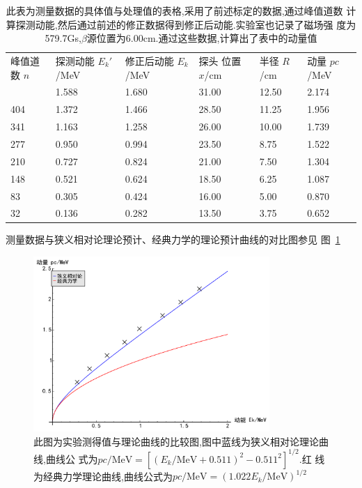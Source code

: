 \documentclass[aps,pre,12pt,preprint,onecolumn,showpacs,showkeys]{revtex4-1}
\begin{document}
\begin{table}[htbp]
  \caption{\label{tab:table1}%
此表为测量数据的具体值与处理值的表格,采用了前述标定的数据,通过峰值道数
计算探测动能,然后通过前述的修正数据得到修正后动能.实验室也记录了磁场强
度为579.7Gs,$\beta$源位置为6.00cm.通过这些数据,计算出了表中的动量值}
\begin{ruledtabular}
  \begin{tabular}{llllll}
     峰值道数 $n$ & 探测动能 $E_k'$/MeV & 修正后动能  $E_k$/MeV & 探头
     位置 $x$/cm & 半径 $R$/cm & 动量 $pc$/MeV\\
     \colrule
     469.0 & 1.588 & 1.680 & 31.00 & 12.50 & 2.174 \\
404 & 1.372 & 1.466 & 28.50 & 11.25 & 1.956 \\
341 & 1.163 & 1.258 & 26.00 & 10.00 & 1.739 \\
277 & 0.950 & 0.994 & 23.50 & 8.75 & 1.522 \\
210 & 0.727 & 0.824 & 21.00 & 7.50 & 1.304 \\
148 & 0.521 & 0.624 & 18.50 & 6.25 & 1.087 \\
83 & 0.305 & 0.424 & 16.00 & 5.00 & 0.870 \\
32 & 0.136 & 0.282 & 13.50 & 3.75 & 0.652 
\end{tabular}
\end{ruledtabular}
\end{table}


测量数据与狭义相对论理论预计、经典力学的理论预计曲线的对比图参见
图~\ref{fig:plot2}

\begin{figure}[htbp]
  \centering
\includegraphics[width=0.8\textwidth]{plot2.pdf}
\caption{\label{fig:plot2}%
此图为实验测得值与理论曲线的比较图,图中蓝线为狭义相对论理论曲线,曲线公
式为$pc/\text{MeV} = [(E_k/\text{MeV} + 0.511)^2 - 0.511^2]^{1/2}$.红
线为经典力学理论曲线,曲线公式为$pc/\text{MeV} = (1.022E_k/\text{MeV})^{1/2}$}
\end{figure}
\end{document}
